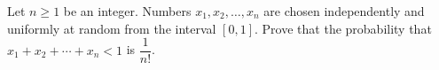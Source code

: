 Let $n\ge1$ be an integer. Numbers $x_1,x_2,\dots,x_n$ are chosen independently and uniformly at random from the interval $[0,1]$. Prove that the probability that $x_1+x_2+\cdots+x_n<1$ is $\dfrac{1}{n!}$.
